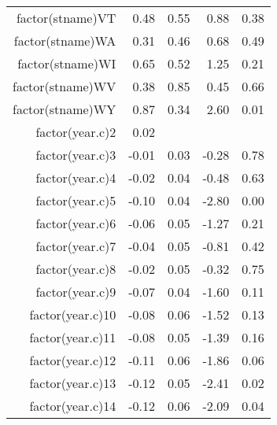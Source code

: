 \begin{table}[ht]
\begin{tabular}{rrrrr}
  factor(stname)VT & 0.48 & 0.55 & 0.88 & 0.38 \\ 
  factor(stname)WA & 0.31 & 0.46 & 0.68 & 0.49 \\ 
  factor(stname)WI & 0.65 & 0.52 & 1.25 & 0.21 \\ 
  factor(stname)WV & 0.38 & 0.85 & 0.45 & 0.66 \\ 
  factor(stname)WY & 0.87 & 0.34 & 2.60 & 0.01 \\ 
  factor(year.c)2 & 0.02 &  &  &  \\ 
  factor(year.c)3 & -0.01 & 0.03 & -0.28 & 0.78 \\ 
  factor(year.c)4 & -0.02 & 0.04 & -0.48 & 0.63 \\ 
  factor(year.c)5 & -0.10 & 0.04 & -2.80 & 0.00 \\ 
  factor(year.c)6 & -0.06 & 0.05 & -1.27 & 0.21 \\ 
  factor(year.c)7 & -0.04 & 0.05 & -0.81 & 0.42 \\ 
  factor(year.c)8 & -0.02 & 0.05 & -0.32 & 0.75 \\ 
  factor(year.c)9 & -0.07 & 0.04 & -1.60 & 0.11 \\ 
  factor(year.c)10 & -0.08 & 0.06 & -1.52 & 0.13 \\ 
  factor(year.c)11 & -0.08 & 0.05 & -1.39 & 0.16 \\ 
  factor(year.c)12 & -0.11 & 0.06 & -1.86 & 0.06 \\ 
  factor(year.c)13 & -0.12 & 0.05 & -2.41 & 0.02 \\ 
  factor(year.c)14 & -0.12 & 0.06 & -2.09 & 0.04 \\ 
   \hline
\end{tabular}
\end{table}
